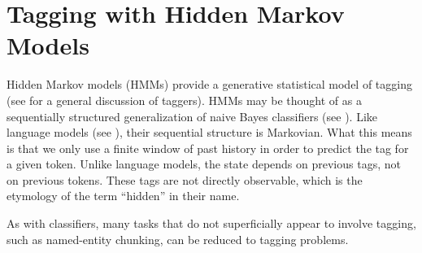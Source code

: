 \chapter{Tagging with Hidden Markov Models}\label{chap:hmm}

Hidden Markov models (HMMs) provide a generative statistical model of
tagging (see  for a general discussion of taggers).
HMMs may be thought of as a sequentially structured generalization of
naive Bayes classifiers (see ).  Like language
models (see ), their sequential structure is
Markovian.  What this means is that we only use a finite window of
past history in order to predict the tag for a given token.  Unlike
language models, the state depends on previous tags, not on previous
tokens.  These tags are not directly observable, which is the
etymology of the term ``hidden'' in their name.

As with classifiers, many tasks that do not superficially appear
to involve tagging, such as named-entity chunking, can be reduced
to tagging problems.


